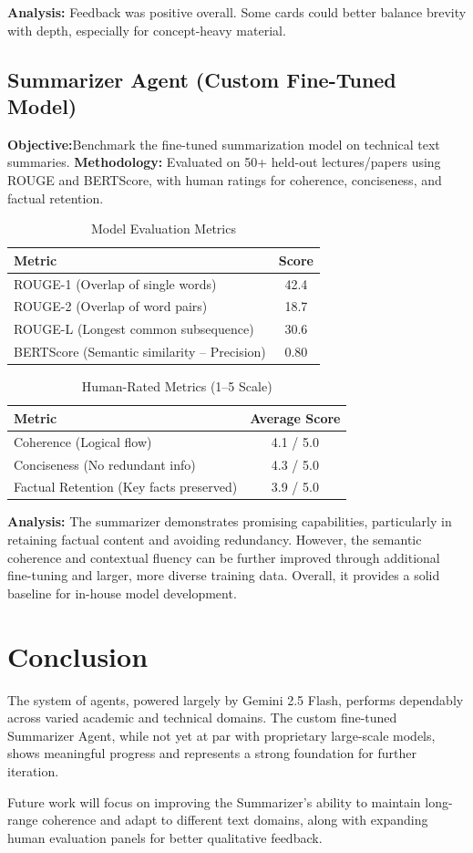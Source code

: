 \documentclass[12pt,a4paper]{article}
\begin{document}
\textbf{Analysis:} Feedback was positive overall. Some cards could better balance brevity with depth, especially for concept-heavy material.

\subsection{Summarizer Agent (Custom Fine-Tuned Model)}
\textbf{Objective:}Benchmark the fine-tuned summarization model on technical text summaries.
\textbf{Methodology:} Evaluated on 50+ held-out lectures/papers using ROUGE and BERTScore, with human ratings for coherence, conciseness, and factual retention.

\begin{table}[H]
\centering
\caption{Model Evaluation Metrics}
\begin{tabular}{lc}
\toprule
\textbf{Metric} & \textbf{Score} \\
\midrule
ROUGE-1 (Overlap of single words) & 42.4 \\
ROUGE-2 (Overlap of word pairs) & 18.7 \\
ROUGE-L (Longest common subsequence) & 30.6 \\
BERTScore (Semantic similarity – Precision) & 0.80 \\
\bottomrule
\end{tabular}
\end{table}

\begin{table}[H]
\centering
\caption{Human-Rated Metrics (1–5 Scale)}
\begin{tabular}{lc}
\toprule
\textbf{Metric} & \textbf{Average Score} \\
\midrule
Coherence (Logical flow) & 4.1 / 5.0 \\
Conciseness (No redundant info) & 4.3 / 5.0 \\
Factual Retention (Key facts preserved) & 3.9 / 5.0 \\
\bottomrule
\end{tabular}
\end{table}

\textbf{Analysis:} The summarizer demonstrates promising capabilities, particularly in retaining factual content and avoiding redundancy. However, the semantic coherence and contextual fluency can be further improved through additional fine-tuning and larger, more diverse training data. Overall, it provides a solid baseline for in-house model development.

\section{Conclusion}
The system of agents, powered largely by Gemini 2.5 Flash, performs dependably across varied academic and technical domains. The custom fine-tuned Summarizer Agent, while not yet at par with proprietary large-scale models, shows meaningful progress and represents a strong foundation for further iteration.  

Future work will focus on improving the Summarizer’s ability to maintain long-range coherence and adapt to different text domains, along with expanding human evaluation panels for better qualitative feedback.
\end{document}

